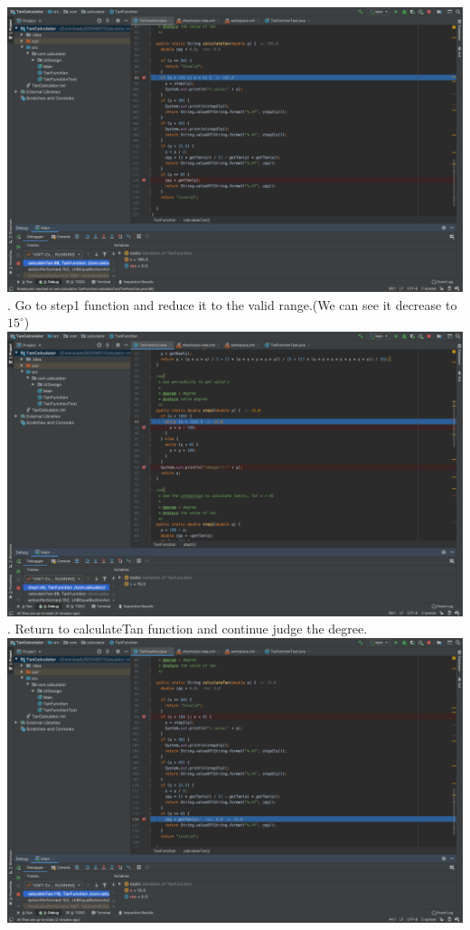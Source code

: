 \documentclass[letterpaper, 11pt]{report}
\begin{document}
\includegraphics[width=15cm]{step2}\\
. Go to step1 function and reduce it to the valid range.(We can see it decrease to $15^\circ $)\\
\newline
\includegraphics[width=15cm]{step3}\\
\pagebreak
{}. Return to calculateTan function and continue judge the degree.\\
\newline
\includegraphics[width=15cm]{step4}\\
\end{document}
